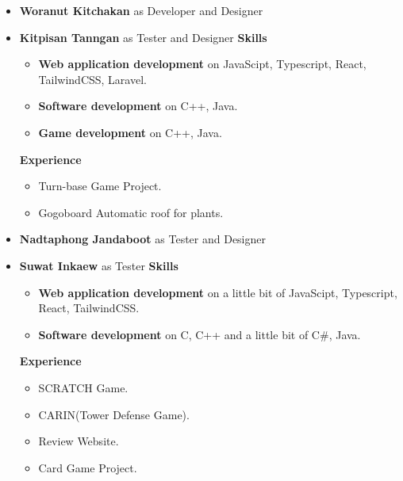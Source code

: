 \documentclass[a4paper, 12pt]{report}
\begin{document}
\begin{itemize}
            \item \textbf{Woranut Kitchakan} as Developer and Designer

            \item \textbf{Kitpisan Tanngan} as Tester and Designer
                \textbf{Skills}
                \begin{itemize}
                    \item \textbf{Web application development} on JavaScipt, Typescript, React, TailwindCSS, Laravel.
                    \item \textbf{Software development} on  C++, Java.
                    \item \textbf{Game development} on C++, Java.
                \end{itemize}
            
                \textbf{Experience}
                \begin{itemize}
                    \item Turn-base Game Project.
                    \item Gogoboard Automatic roof for plants.
                \end{itemize}

            \item \textbf{Nadtaphong Jandaboot} as Tester and Designer

            \item \textbf{Suwat Inkaew} as Tester
            \textbf{Skills}
                \begin{itemize}
                    \item \textbf{Web application development} on a little bit of JavaScipt, Typescript, React, TailwindCSS.
                    \item \textbf{Software development} on C, C++ and a little bit of C\#, Java.
                \end{itemize}
                
                \textbf{Experience}
                \begin{itemize}
                    \item SCRATCH Game.
                    \item CARIN(Tower Defense Game).
                    \item Review Website.
                    \item Card Game Project.
                \end{itemize}

        \end{itemize}
\end{document}
